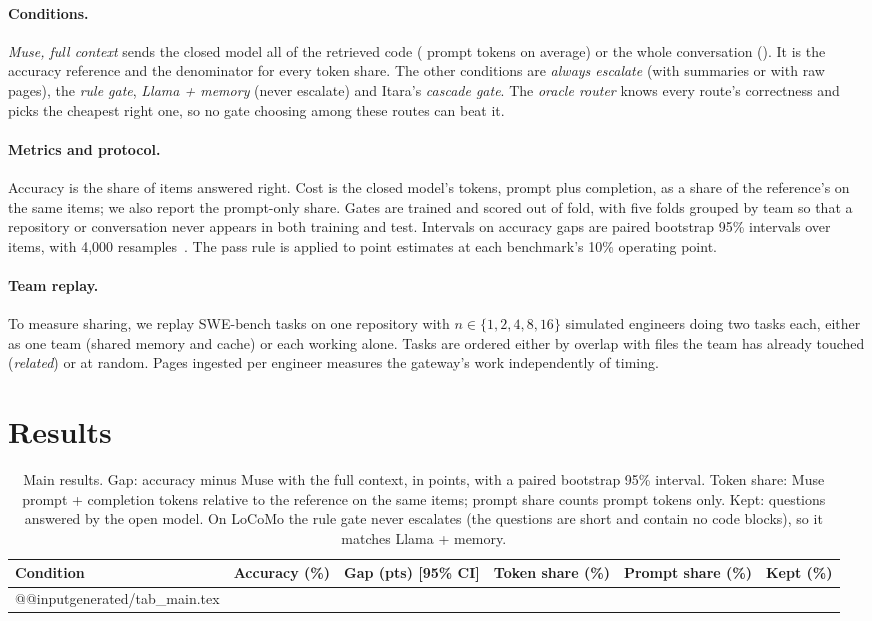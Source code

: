 \documentclass[10pt,twocolumn]{article}
\makeatletter
\newcommand{\rows}[1]{\csname @@input\endcsname generated/#1 }
\makeatother
\begin{document}
\paragraph{Conditions.} \emph{Muse, full context} sends the closed model all of the retrieved code (\directIn{} prompt tokens on average) or the whole conversation (\directInLoco). It is the accuracy reference and the denominator for every token share. The other conditions are \emph{always escalate} (with summaries or with raw pages), the \emph{rule gate}, \emph{Llama + memory} (never escalate) and Itara's \emph{cascade gate}. The \emph{oracle router} knows every route's correctness and picks the cheapest right one, so no gate choosing among these routes can beat it.

\paragraph{Metrics and protocol.} Accuracy is the share of items answered right. Cost is the closed model's tokens, prompt plus completion, as a share of the reference's on the same items; we also report the prompt-only share. Gates are trained and scored out of fold, with five folds grouped by team so that a repository or conversation never appears in both training and test. Intervals on accuracy gaps are paired bootstrap 95\% intervals over items, with 4{,}000 resamples~\citep{efron1993bootstrap}. The pass rule is applied to point estimates at each benchmark's 10\% operating point.

\paragraph{Team replay.} To measure sharing, we replay SWE-bench tasks on one repository with $n\in\{1,2,4,8,16\}$ simulated engineers doing two tasks each, either as one team (shared memory and cache) or each working alone. Tasks are ordered either by overlap with files the team has already touched (\emph{related}) or at random. Pages ingested per engineer measures the gateway's work independently of timing.

\section{Results}
\label{sec:results}

\begin{table}[t]
\centering
\small
\caption{Main results. Gap: accuracy minus Muse with the full context, in points, with a paired bootstrap 95\% interval. Token share: Muse prompt + completion tokens relative to the reference on the same items; prompt share counts prompt tokens only. Kept: questions answered by the open model. On LoCoMo the rule gate never escalates (the questions are short and contain no code blocks), so it matches Llama + memory.}
\label{tab:main}
\begin{tabular}{lrcrrr}
\toprule
Condition & Accuracy (\%) & Gap (pts) [95\% CI] & Token share (\%) & Prompt share (\%) & Kept (\%)\\
\midrule
\rows{tab_main.tex}
\bottomrule
\end{tabular}
\end{table}
\end{document}
